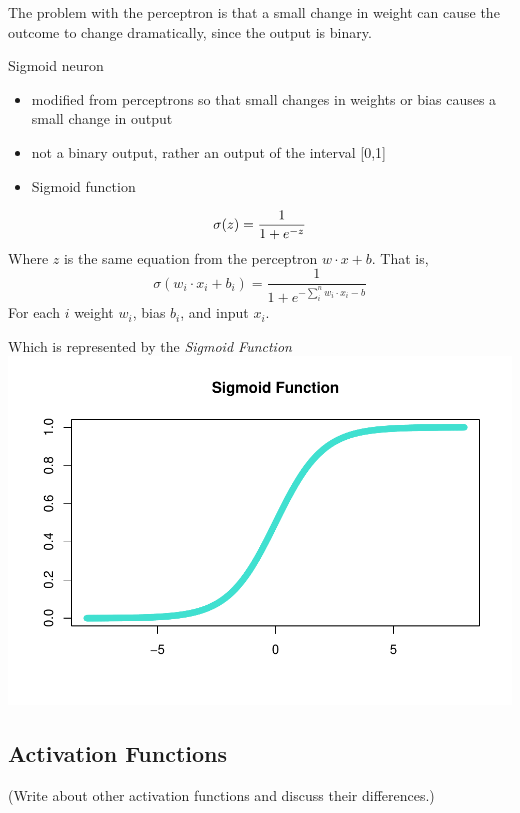 The problem with the perceptron is that a small change in weight can
cause the outcome to change dramatically, since the output is binary.

Sigmoid neuron

\begin{itemize}
\tightlist
\item
  modified from perceptrons so that small changes in weights or bias
  causes a small change in output
\item
  not a binary output, rather an output of the interval {[}0,1{]}
\item
  Sigmoid function
\end{itemize}

\[
\sigma(z) = \frac{1}{1+e^{-z}} \\
\] Where \(z\) is the same equation from the perceptron
\(w \cdot x + b\). That is, \[
\sigma(w_i \cdot x_i + b_i) = \frac{1}{1+e^{-\sum_i^n w_i \cdot x_i - b}}
\] For each \(i\) weight \(w_i\), bias \(b_i\), and input \(x_i\).

Which is represented by the \emph{Sigmoid Function}
\includegraphics{ANN_files/unnamed-chunk-2-1.pdf}

\hypertarget{activation-functions}{%
\subsection{Activation Functions}\label{activation-functions}}

(Write about other activation functions and discuss their differences.)

